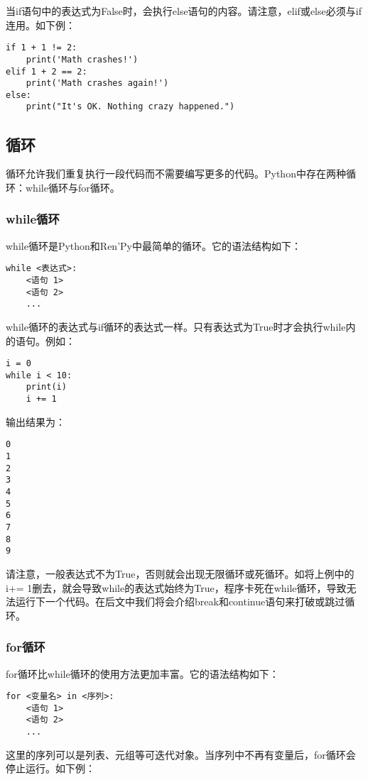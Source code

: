 当if语句中的表达式为False时，会执行else语句的内容。请注意，elif或else必须与if连用。如下例：

\begin{lstlisting}
if 1 + 1 != 2:
    print('Math crashes!')
elif 1 + 2 == 2:
    print('Math crashes again!')
else:
    print("It's OK. Nothing crazy happened.")
\end{lstlisting}

\subsection{循环}
循环允许我们重复执行一段代码而不需要编写更多的代码。Python中存在两种循环：while循环与for循环。

\subsubsection{while循环}
while循环是Python和Ren'Py中最简单的循环。它的语法结构如下：
\begin{lstlisting}
while <表达式>:
    <语句 1>
    <语句 2>
    ...
\end{lstlisting}

while循环的表达式与if循环的表达式一样。只有表达式为True时才会执行while内的语句。例如：

\begin{lstlisting}
i = 0
while i < 10:
    print(i)
    i += 1
\end{lstlisting}

输出结果为：
\begin{lstlisting}
0
1
2
3
4
5
6
7
8
9
\end{lstlisting}

\begin{Warning}
    请注意，一般表达式不为True，否则就会出现无限循环或死循环。如将上例中的i+= 1删去，就会导致while的表达式始终为True，程序卡死在while循环，导致无法运行下一个代码。在后文中我们将会介绍break和continue语句来打破或跳过循环。
\end{Warning}

\subsubsection{for循环\PyOnly }
for循环比while循环的使用方法更加丰富。它的语法结构如下：
\begin{lstlisting}
for <变量名> in <序列>:
    <语句 1>
    <语句 2>
    ...
\end{lstlisting}

这里的序列可以是列表、元组等可迭代对象。当序列中不再有变量后，for循环会停止运行。如下例：


